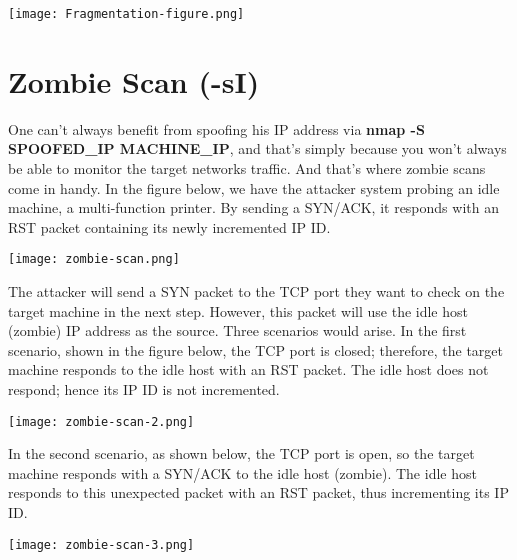 \documentclass[11pt,a4paper]{article}
\begin{document}
\begin{center}
  \texttt{[image: Fragmentation-figure.png]}
  \label{fig:Fragmentation}
\end{center}

\section{Zombie Scan (-sI)}
One can't always benefit from spoofing his IP address via \textbf{nmap -S SPOOFED\_IP MACHINE\_IP}, and that's simply because you won't always be able to monitor the target networks traffic. And that's where zombie scans come in handy.
In the figure below, we have the attacker system probing an idle machine, a multi-function printer. By sending a SYN/ACK, it responds with an RST packet containing its newly incremented IP ID.

\begin{center}
  \texttt{[image: zombie-scan.png]}
  \label{fig:Zombie-scan}
\end{center}

The attacker will send a SYN packet to the TCP port they want to check on the target machine in the next step. However, this packet will use the idle host (zombie) IP address as the source. Three scenarios would arise. In the first scenario, shown in the figure below, the TCP port is closed; therefore, the target machine responds to the idle host with an RST packet. The idle host does not respond; hence its IP ID is not incremented.

\begin{center}
  \texttt{[image: zombie-scan-2.png]}
  \label{fig:Zombie-scan-2}
\end{center}

In the second scenario, as shown below, the TCP port is open, so the target machine responds with a SYN/ACK to the idle host (zombie). The idle host responds to this unexpected packet with an RST packet, thus incrementing its IP ID.

\begin{center}
  \texttt{[image: zombie-scan-3.png]}
  \label{fig:Zombie-scan-3}
\end{center}
\end{document}
